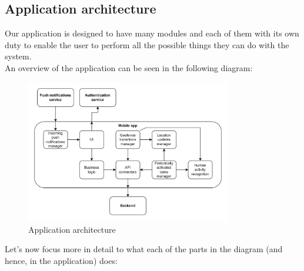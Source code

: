 \documentclass[../../main]{subfiles}
\begin{document}
\label{ss:application-architecture}
\subsection{Application architecture}
Our application is designed to have many modules and each of them with its own duty to enable the user to perform all the possible things they can do with the system.\\
An overview of the application can be seen in the following diagram:
\begin{figure}[h]
    \centering
    \includegraphics[width=0.8\textwidth]{images/application_architecture.png}
    \caption{Application architecture}\label{img:application_architecture}
\end{figure}
Let's now focus more in detail to what each of the parts in the diagram (and hence, in the application) does:
\end{document}

